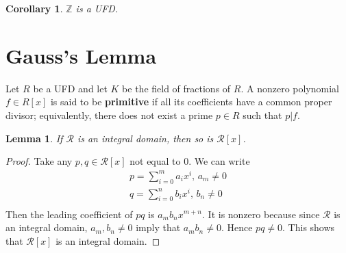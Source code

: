 \documentclass{article}
\theoremstyle{norm}
\newtheorem{lemma}[theorem]{Lemma}
\newtheorem{corollary}[theorem]{Corollary}
\begin{document}
\begin{corollary}
$\mathbb Z$ is a UFD.
\end{corollary}


\section{Gauss's Lemma}
Let $R$ be a UFD and let $K$ be the field of fractions of $R$. A nonzero polynomial $f\in R[x]$ is said to be \textbf{primitive} if all its coefficients have a common proper divisor; equivalently, there does not exist a prime $p\in R$ such that $p|f$.

\begin{lemma}\label{polyintdom}
If $\mathcal{R}$ is an integral domain, then so is $\mathcal{R}[x]$.
\end{lemma}
\begin{proof}
Take any $p,q\in \mathcal{R}[x]$ not equal to 0. We can write
\begin{eqnarray*}
p=\sum_{i=0}^m a_ix^i,\,a_m\neq 0\\
q=\sum_{i=0}^n b_ix^i,\, b_n\neq 0\\
\end{eqnarray*}
Then the leading coefficient of $pq$ is $a_mb_nx^{m+n}$. It is nonzero because since $\mathcal{R}$ is an integral domain, $a_m,b_n\neq 0$ imply that $a_mb_n\neq 0$. Hence $pq\neq 0$. This shows that $\mathcal{R}[x]$ is an integral domain.
\end{proof}
\end{document}
